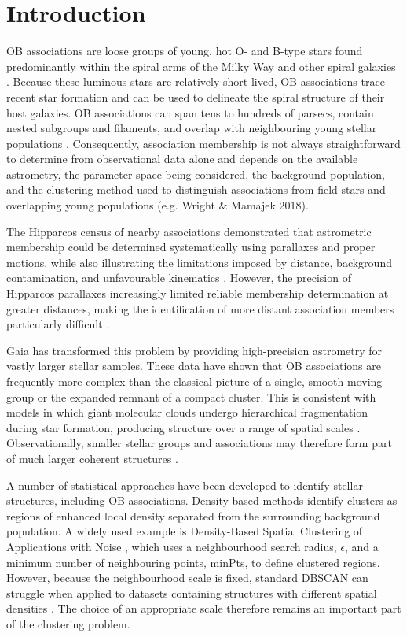 \documentclass[fleqn,usenatbib]{mnras}
\begin{document}


\section{Introduction}

OB associations are loose groups of young, hot O- and B-type stars found predominantly within the spiral arms of the Milky Way and other spiral galaxies \citep{Ambartsumian1947}. Because these luminous stars are relatively short-lived, OB associations trace recent star formation and can be used to delineate the spiral structure of their host galaxies. 
OB associations can span tens to hundreds of parsecs, contain nested subgroups and filaments, and overlap with neighbouring young stellar populations \citep{Blaauw1964}. Consequently, association membership is not always straightforward to determine from observational data alone and depends on the available astrometry, the parameter space being considered, the background population, and the clustering method used to distinguish associations from field stars and overlapping young populations (e.g. Wright \& Mamajek 2018).

The Hipparcos census of nearby associations demonstrated that astrometric membership could be determined systematically using parallaxes and proper motions, while also illustrating the limitations imposed by distance, background contamination, and unfavourable kinematics \citep{deZeeuw1999}. However, the precision of Hipparcos parallaxes increasingly limited reliable membership determination at greater distances, making the identification of more distant association members particularly difficult \citep{Perryman1997}.

Gaia has transformed this problem by providing high-precision astrometry for vastly larger stellar samples. These data have shown that OB associations are frequently more complex than the classical picture of a single, smooth moving group or the expanded remnant of a compact cluster. This is consistent with models in which giant molecular clouds undergo hierarchical fragmentation during star formation, producing structure over a range of spatial scales \citep{Hopkins2013}. Observationally, smaller stellar groups and associations may therefore form part of much larger coherent structures \citep{Wright2018}.

A number of statistical approaches have been developed to identify stellar structures, including OB associations. Density-based methods identify clusters as regions of enhanced local density separated from the surrounding background population. A widely used example is Density-Based Spatial Clustering of Applications with Noise \citep{Ester1996}, which uses a neighbourhood search radius, $\epsilon$, and a minimum number of neighbouring points, minPts, to define clustered regions. However, because the neighbourhood scale is fixed, standard DBSCAN can struggle when applied to datasets containing structures with different spatial densities \citep{Ankerst1999}. The choice of an appropriate scale therefore remains an important part of the clustering problem. 
\end{document}
